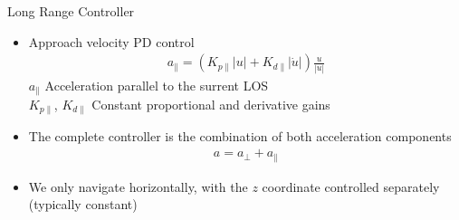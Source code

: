 


\begin{frame}{Long Range Controller}
	\begin{itemize}
	\item	Approach velocity PD control
	\begin{align*}
		a_\parallel = \left( K_{p\parallel} |u| + K_{d\parallel} |\dot{u}| \right) \frac{u}{|u|} 
	\end{align*}
	$a_\parallel$ Acceleration parallel to the surrent LOS  \\ %
	$K_{p\parallel}$, $K_{d\parallel}$ Constant proportional and derivative gains
	
	\item The complete controller is the combination of both acceleration components
	\begin{align*}
		a = a_\perp + a_\parallel
	\end{align*}
	\item We only navigate horizontally, with the $z$ coordinate controlled separately (typically constant)
	\end{itemize}
\end{frame}



